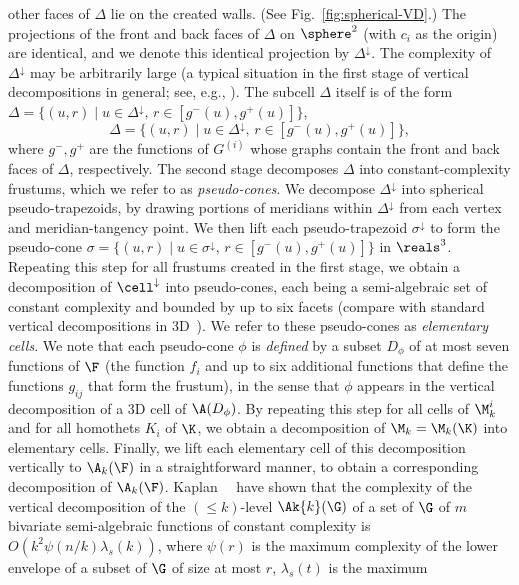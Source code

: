 other faces  of $\Delta$ lie on the created walls. (See Fig.~\ref{fig:spherical-VD}.) 
The projections of the front and back 
faces of $\Delta$ on $\sphere^2$ (with $c_i$ as the origin) are identical, and we denote 
this identical projection by $\Delta^\downarrow$. The complexity of $\Delta^\downarrow$ 
may be arbitrarily large (a typical situation in the first stage of vertical decompositions
in general; see, e.g., \cite{CEGS}). The subcell $\Delta$ itself is of the form 
\ifsocgproc
$\Delta = \{ (u,r) \mid u \in \Delta^\downarrow,\, r\in [g^-(u),g^+(u)] \}$,
\else
\[ 
\Delta = \{ (u,r) \mid u \in \Delta^\downarrow,\, r\in [g^-(u),g^+(u)] \} ,
\]
\fi
where $g^-, g^+$ are the functions of $G^{(i)}$ whose graphs contain the front and back faces of $\Delta$,
respectively. 
%
The second stage decomposes $\Delta$ into constant-complexity frustums, which we refer to as 
\emph{pseudo-cones}. We decompose $\Delta^\downarrow$ into spherical pseudo-trapezoids,
by drawing portions of meridians within $\Delta^\downarrow$ from each vertex and meridian-tangency 
point. We then lift each pseudo-trapezoid $\sigma^\downarrow$ to form the pseudo-cone 
$\sigma = \{ (u,r) \mid u \in \sigma^\downarrow, \, r \in [g^-(u),g^+(u)] \}$ in $\reals^3$.
%
Repeating this step for all frustums created in the first stage, we obtain
a decomposition of $\cell^\downarrow$ into pseudo-cones,
each being a semi-algebraic set of constant complexity and bounded by up to six facets
(compare with standard vertical decompositions in 3D~\cite{CEGS}). 
We refer to these pseudo-cones as \emph{elementary cells}. We note that each pseudo-cone 
$\phi$ is \emph{defined} by a subset $D_\phi$ of at most seven functions of $\F$ (the function $f_i$
and up to six additional functions that define the functions $g_{ij}$ that form the frustum), 
in the sense that $\phi$ appears in the vertical decomposition of a 3D cell of $\A(D_\phi)$.
By repeating this step for all cells of $\M_k^i$ and for all homothets $K_i$ of $\K$, 
we obtain a decomposition of $\M_k = \M_k(\K)$ into elementary cells. Finally, we 
lift each elementary cell of this decomposition vertically to $\A_k(\F)$ in a straightforward manner,
to obtain a corresponding decomposition of $\A_k(\F)$.
%
Kaplan~\etal~\cite[Lemma~6.2]{KMRSS} have shown that the complexity of the vertical decomposition of 
the $(\le k)$-level $\Ak{k}(\G)$ of a set of $\G$ of $m$ bivariate semi-algebraic functions of constant 
complexity is $O(k^2\psi(n/k)\lambda_s(k))$, where $\psi(r)$ is the maximum complexity of 
the lower envelope of a subset of $\G$ of size at most $r$, $\lambda_s(t)$ is the maximum 
